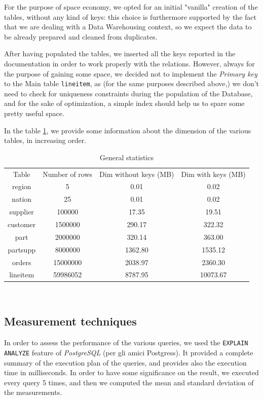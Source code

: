 For the purpose of space economy, we opted for an initial "vanilla" creation of the tables, without any kind of keys: this choice is furthermore supported by the fact that we are dealing with a Data Warehousing context, so we expect the data to be already prepared and cleaned from duplicates.

After having populated the tables, we inserted all the keys reported in the documentation in order to work properly with the relations. However, always for the purpose of gaining some space, we decided not to implement the \textit{Primary key} to the Main table \texttt{lineitem}, as (for the same purposes described above,) we don't need to check for uniqueness constraints during the population of the Database, and for the sake of optimization, a simple index should help us to spare some pretty useful space.

In the table \ref{tab:table_dimensions}, we provide some information about the dimension of the various tables, in increasing order.

\begin{table}[h!]
\centering
\begin{tabular}{c|c|c|c}
\rowcolor{blue!50} Table & Number of rows & Dim without keys (MB) & Dim with keys (MB)\\
\rowcolor{gray!10} region & 5 & 0.01 & 0.02\\ 
\rowcolor{white} nation & 25 & 0.01 & 0.02\\ 
\rowcolor{gray!10} supplier & 100000 & 17.35  & 19.51 \\ 
\rowcolor{white} customer & 1500000& 290.17  & 322.32 \\ 
\rowcolor{gray!10} part & 2000000 & 320.14  & 363.00 \\ 
\rowcolor{white} partsupp & 8000000 & 1362.80  & 1535.12 \\
\rowcolor{gray!10} orders & 15000000 & 2038.97  & 2360.30 \\
\rowcolor{white} lineitem & 59986052 & 8787.95  & 10073.67 \\
\end{tabular}\\[0.5cm]
    \caption{General statistics}
    \label{tab:table_dimensions}
\end{table}

\subsection{Measurement techniques}

In order to assess the performance of the various queries, we used the 
\verb|EXPLAIN ANALYZE| feature of \textit{PostgreSQL} (per gli amici Postgress). It provided a complete summary of the execution plan of the queries, and provides also the execution time in milliseconds.
In order to have some significance on the result, we executed every query 5 times, and then we computed the mean and standard deviation of the measurements.


